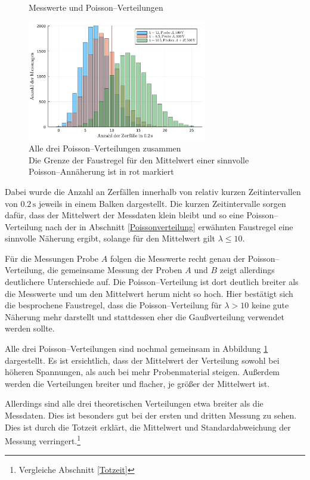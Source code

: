 \documentclass[12pt,a4paper]{scrartcl}
\numberwithin{equation}{section} %
\begin{document}
\begin{figure}
	\caption{Messwerte und Poisson--Verteilungen}
	\label{fig:poisson single}
	\vspace{12pt}
	
	\includegraphics[width=0.7\textwidth]{../media/B3.1/allePoisson.pdf}
	\caption{Alle drei Poisson--Verteilungen zusammen\\
		Die Grenze der Faustregel für den Mittelwert einer sinnvolle Poisson--Annäherung ist in rot markiert}
	\label{fig:allePoisson}	
\end{figure}

\noindent
Dabei wurde die Anzahl an Zerfällen innerhalb von relativ kurzen Zeitintervallen von $0.2 \mathrm{\,s}$ jeweils in einem Balken dargestellt. Die kurzen Zeitintervalle sorgen dafür, dass der Mittelwert der Messdaten klein bleibt und so eine Poisson--Verteilung nach der in Abschnitt \ref{Poissonverteilung} erwähnten Faustregel eine sinnvolle Näherung ergibt, solange für den Mittelwert gilt $\lambda \leq 10$.

Für die Messungen  Probe $A$ folgen die Messwerte recht genau der Poisson--Verteilung, die gemeinsame Messung der Proben $A$ und $B$ zeigt allerdings deutlichere Unterschiede auf. Die Poisson--Verteilung ist dort deutlich breiter als die Messwerte und um den Mittelwert herum nicht so hoch. Hier bestätigt sich die besprochene Faustregel, dass die Poisson--Verteilung für $\lambda > 10$ keine gute Näherung mehr darstellt und stattdessen eher die Gaußverteilung verwendet werden sollte.

Alle drei Poisson--Verteilungen sind nochmal gemeinsam in Abbildung \ref{fig:allePoisson} dargestellt. Es ist ersichtlich, dass der Mittelwert der Verteilung sowohl bei höheren Spannungen, als auch bei mehr Probenmaterial steigen. Außerdem werden die Verteilungen breiter und flacher, je größer der Mittelwert ist.

Allerdings sind alle drei theoretischen Verteilungen etwa breiter als die Messdaten. Dies ist besonders gut bei der ersten und dritten Messung zu sehen. Dies ist durch die Totzeit erklärt, die Mittelwert und Standardabweichung der Messung verringert.\footnote{Vergleiche Abschnitt \ref{Totzeit}}
\end{document}
